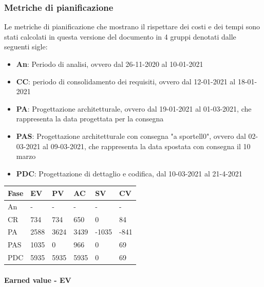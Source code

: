 \subsubsection{Metriche di pianificazione}
    Le metriche di pianificazione che mostrano il rispettare dei costi e dei tempi sono stati calcolati in questa versione del documento in 4 gruppi denotati dalle seguenti sigle:
    \begin{itemize}
        \item \textbf{An}: Periodo di analisi, ovvero dal 26-11-2020 al 10-01-2021
        \item \textbf{CC}: periodo di consolidamento dei requisiti, ovvero dal 12-01-2021 al 18-01-2021
        \item \textbf{PA}: Progettazione architetturale, ovvero dal 19-01-2021 al 01-03-2021, che rappresenta la data progettata per la consegna
        \item \textbf{PAS}: Progettazione architetturale con consegna "a sportell0", ovvero dal 02-03-2021 al 09-03-2021, che rappresenta la data spostata con consegna il 10 marzo
        \item \textbf{PDC}: Progettazione di dettaglio e codifica, dal 10-03-2021 al 21-4-2021
    \end{itemize}
    
    
    \begin{longtabu} to \textwidth {| X[0.1,c m] | X[0.1,c m]| X[0.1,c m]| X[0.1,c m]| X[0.1,c m]| X[0.1,c m] |}
        \hline
        \textbf{Fase} &
        \textbf{EV} &
        \textbf{PV} &
        \textbf{AC} &
        \textbf{SV} &
        \textbf{CV} \\
        \hline
        An & - & - & - & - & -  \\ 
        \hline
        CR & 734 & 734 & 650 & 0 & 84 \\
        \hline
        PA & 2588 & 3624 & 3439 & -1035 & -841\\
        \hline
        PAS & 1035 & 0 & 966 & 0 & 69 \\
        \hline
        PDC & 5935 & 5935 & 5935 & 0 & 69 \\
        \hline 
        \end{longtabu}

        \paragraph{Earned value - EV}

